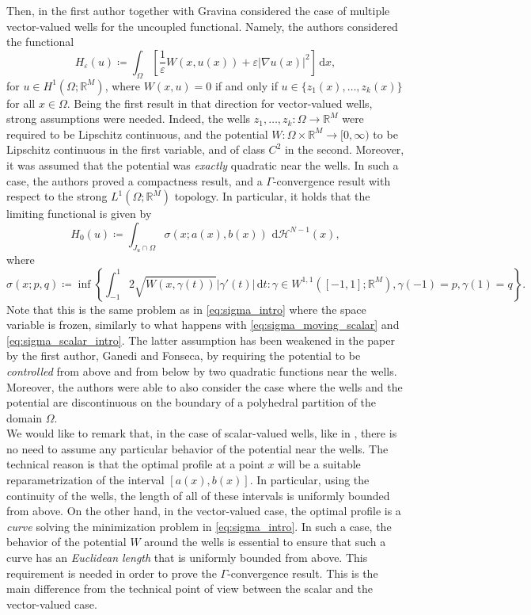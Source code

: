 \documentclass[a4paper, 11pt, reqno]{amsart}
\theoremstyle{plain}
\theoremstyle{definition}
\theoremstyle{remark}
\newcommand{\R}{\mathbb R}
\newcommand{\dd}{\,\mathrm{d}}
\newcommand{\dhno}{\,\dd{\mathcal H}^{N-1}}
\begin{document}
Then, in \cite{CriGra} the first author together with Gravina considered the case of multiple vector-valued wells for the uncoupled functional.
Namely, the authors considered the functional
\[
H_\varepsilon(u) \coloneqq \int_\Omega \left[ \frac{1}{\varepsilon}W(x,u(x)) + \varepsilon|\nabla u(x)|^2 \right] \dd x,
\]
for $u\in H^1(\Omega;\R^M)$, where $W(x,u)=0$ if and only if $u\in\{z_1(x),\dots,z_k(x)\}$ for all $x\in\Omega$.
Being the first result in that direction for vector-valued wells, strong assumptions were needed.
Indeed, the wells $z_1,\dots,z_k\colon\Omega\to\R^M$ were required to be Lipschitz continuous, and the potential $W\colon\Omega\times\R^M\to[0,\infty)$ to be Lipschitz continuous in the first variable, and of class $C^2$ in the second. Moreover, it was assumed that the potential was \emph{exactly} quadratic near the wells.
In such a case, the authors proved a compactness result, and a $\Gamma$-convergence result with respect to the strong $L^1(\Omega;\R^M)$ topology. In particular, it holds that the limiting functional is given by
\begin{equation}\label{eq:functional_H0}
H_0(u)\coloneqq \int_{J_u\cap\Omega} \sigma(x; a(x), b(x))\dhno(x),
\end{equation}
where
\begin{equation}\label{eq:sigma_intro_moving}
\sigma(x;p,q)\coloneqq \inf\left\{\int_{-1}^1 2\sqrt{W(x,\gamma(t))}|\gamma'(t)|\dd t : \gamma\in W^{1,1}([-1,1];\R^M), \gamma(-1)=p, \gamma(1)=q \right\}.
\end{equation}
Note that this is the same problem as in \eqref{eq:sigma_intro} where the space variable is frozen, similarly to what happens with \eqref{eq:sigma_moving_scalar} and \eqref{eq:sigma_scalar_intro}. 
The latter assumption has been weakened in the paper \cite{CriFonGan_moving_sub} by the first author, Ganedi and Fonseca, by requiring the potential to be \emph{controlled} from above and from below by two quadratic functions near the wells.
Moreover, the authors were able to also consider the case where the  wells and the potential are discontinuous on the boundary of a polyhedral partition of the domain $\Omega$.\\

We would like to remark that, in the case of scalar-valued wells, like in \cite{Bou}, there is no need to assume any particular behavior of the potential near the wells. The technical reason is that the optimal profile at a point $x$ will be a suitable reparametrization of the interval $[a(x), b(x)]$. In particular, using the continuity of the wells, the length of all of these intervals is uniformly bounded from above.
On the other hand, in the vector-valued case, the optimal profile is a \emph{curve} solving the minimization problem in \eqref{eq:sigma_intro}.
In such a case, the behavior of the potential $W$ around the wells is essential to ensure that such a curve has an \emph{Euclidean length} that is uniformly bounded from above. This requirement is needed in order to prove the $\Gamma$-convergence result.
This is the main difference from the technical point of view between the scalar and the vector-valued case.\\
\end{document}
